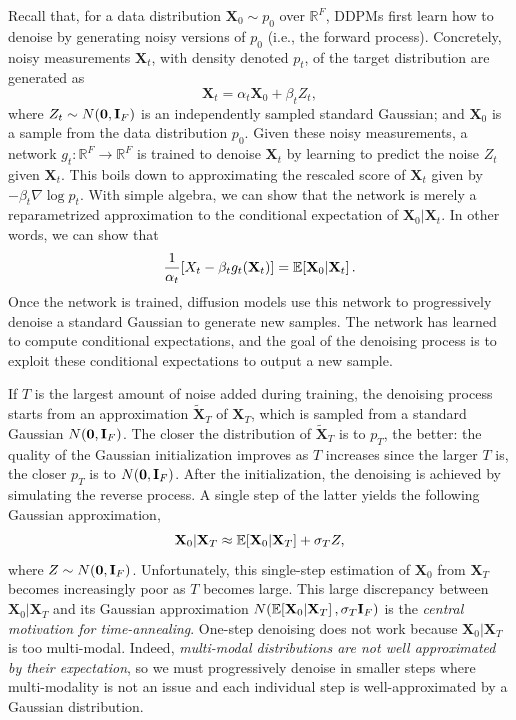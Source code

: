 Recall that, for a data distribution $\mathbf{X}_0 \sim p_0$ over $\mathbb{R}^F$, DDPMs first learn how to denoise by generating noisy versions of $p_0$ (i.e., the forward process). Concretely, noisy measurements $\mathbf{X}_t$, with density denoted $p_t$, of the target distribution are generated as  
\begin{equation}
\mathbf{X}_t = \alpha_t \mathbf{X}_0 +\beta_t Z_t,
\label{eq:noising}
\end{equation}
where $Z_t \sim N\mathopen{}\left(\mathbf{0}, \mathbf{I}_F\right)$ is an independently sampled standard Gaussian; and $\mathbf{X}_0$ is a sample from the data distribution $p_0$. Given these noisy measurements, a network $g_t:\mathbb{R}^F\to\mathbb{R}^F$ is trained to denoise $\mathbf{X}_t$ by learning to predict the noise $Z_t$ given $\mathbf{X}_t$. This boils down to approximating the rescaled score of $\mathbf{X}_t$ given by $-\beta_t \nabla \log p_t$. With simple algebra, we can show that the network is merely a reparametrized approximation to the conditional expectation of $\mathbf{X}_0|\mathbf{X}_t$. In other words, we can show that
\begin{equation}
\label{eq:reparam}
\frac{1}{\alpha_t}\mathopen{}\left[X_t - \beta_t g_t\mathopen{}\left(\mathbf{X}_t\right)\right] = \mathbb{E}\mathopen{}\left[\mathbf{X}_0|\mathbf{X}_t\right].
\end{equation}
Once the network is trained, diffusion models use this network to progressively denoise a standard Gaussian to generate new samples. The network has learned to compute conditional expectations, and the goal of the denoising process is to exploit these conditional expectations to output a new sample. 

If $T$ is the largest amount of noise added during training, the denoising process starts from an approximation $\tilde{\mathbf{X}}_T$ of $\mathbf{X}_T$, which is sampled from a standard Gaussian $N\mathopen{}\left(\mathbf{0}, \mathbf{I}_F\right)$. The closer the distribution of $\tilde{\mathbf{X}}_T$ is to $p_T$, the better: the quality of the Gaussian initialization improves as $T$ increases since the larger $T$ is, the closer $p_T$ is to $N\mathopen{}\left(\mathbf{0}, \mathbf{I}_F\right)$. After the initialization, the denoising is achieved by simulating the reverse process. A single step of the latter yields the following Gaussian approximation, 
\begin{equation}
\label{eq:revdiff}
    \mathbf{X}_0|\mathbf{X}_T \approx \mathbb{E}\mathopen{}\left[\mathbf{X}_0|\mathbf{X}_T\right] + \sigma_T Z,
\end{equation}
where $Z \sim N\mathopen{}\left(\mathbf{0}, \mathbf{I}_F\right)$. Unfortunately, this single-step estimation of $\mathbf{X}_0$ from $\mathbf{X}_T$ becomes increasingly poor as $T$ becomes large. This large discrepancy between $\mathbf{X}_0|\mathbf{X}_T$ and its Gaussian approximation $N\mathopen{}\left(\mathbb{E}\mathopen{}\left[\mathbf{X}_0|\mathbf{X}_T\right], \sigma_T \mathbf{I}_F\right)$ is the \emph{central motivation for time-annealing}. One-step denoising does not work because $\mathbf{X}_0|\mathbf{X}_T$ is too multi-modal. Indeed, \emph{multi-modal distributions are not well approximated by their expectation}, so we must progressively denoise in smaller steps where multi-modality is not an issue and each individual step is well-approximated by a Gaussian distribution. 

